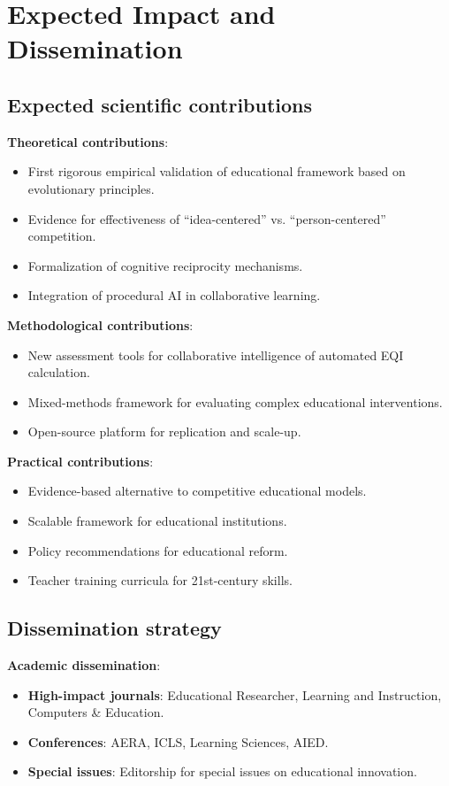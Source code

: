 \section{Expected Impact and Dissemination}
\subsection*{Expected scientific contributions}

\textbf{Theoretical contributions}:
\begin{itemize}
	\item First rigorous empirical validation of educational framework based on evolutionary principles.
	\item Evidence for effectiveness of ``idea-centered'' vs. ``person-centered'' competition.
	\item Formalization of cognitive reciprocity mechanisms.
	\item Integration of procedural AI in collaborative learning.
\end{itemize}

\textbf{Methodological contributions}:
\begin{itemize}
	\item New assessment tools for collaborative intelligence of automated EQI calculation.
	\item Mixed-methods framework for evaluating complex educational interventions.
	\item Open-source platform for replication and scale-up.
\end{itemize}

\textbf{Practical contributions}:
\begin{itemize}
	\item Evidence-based alternative to competitive educational models.
	\item Scalable framework for educational institutions.
	\item Policy recommendations for educational reform.
	\item Teacher training curricula for 21st-century skills.
\end{itemize}

\subsection{Dissemination strategy}

\textbf{Academic dissemination}:
\begin{itemize}
	\item \textbf{High-impact journals}: Educational Researcher, Learning and Instruction, Computers \& Education.
	\item \textbf{Conferences}: AERA, ICLS, Learning Sciences, AIED.
	\item \textbf{Special issues}: Editorship for special issues on educational innovation.
\end{itemize}


